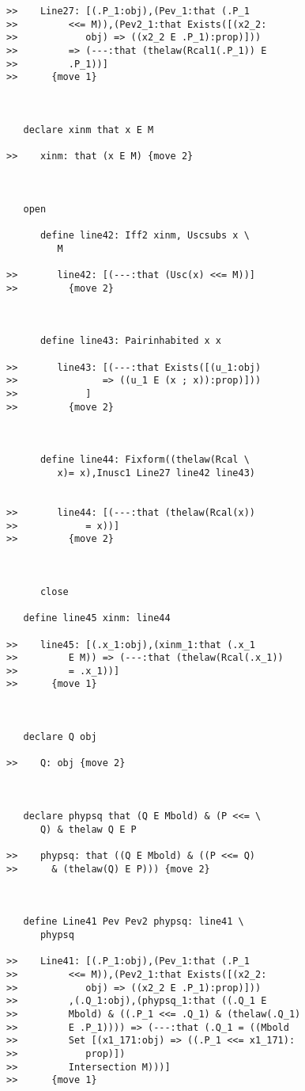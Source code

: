 \documentclass[12pt]{article}
\begin{document}
\begin{verbatim}
>>    Line27: [(.P_1:obj),(Pev_1:that (.P_1
>>         <<= M)),(Pev2_1:that Exists([(x2_2:
>>            obj) => ((x2_2 E .P_1):prop)]))
>>         => (---:that (thelaw(Rcal1(.P_1)) E
>>         .P_1))]
>>      {move 1}



   declare xinm that x E M

>>    xinm: that (x E M) {move 2}



   open

      define line42: Iff2 xinm, Uscsubs x \
         M

>>       line42: [(---:that (Usc(x) <<= M))]
>>         {move 2}



      define line43: Pairinhabited x x

>>       line43: [(---:that Exists([(u_1:obj)
>>               => ((u_1 E (x ; x)):prop)]))
>>            ]
>>         {move 2}



      define line44: Fixform((thelaw(Rcal \
         x)= x),Inusc1 Line27 line42 line43)


>>       line44: [(---:that (thelaw(Rcal(x))
>>            = x))]
>>         {move 2}



      close

   define line45 xinm: line44

>>    line45: [(.x_1:obj),(xinm_1:that (.x_1
>>         E M)) => (---:that (thelaw(Rcal(.x_1))
>>         = .x_1))]
>>      {move 1}



   declare Q obj

>>    Q: obj {move 2}



   declare phypsq that (Q E Mbold) & (P <<= \
      Q) & thelaw Q E P

>>    phypsq: that ((Q E Mbold) & ((P <<= Q)
>>      & (thelaw(Q) E P))) {move 2}



   define Line41 Pev Pev2 phypsq: line41 \
      phypsq

>>    Line41: [(.P_1:obj),(Pev_1:that (.P_1
>>         <<= M)),(Pev2_1:that Exists([(x2_2:
>>            obj) => ((x2_2 E .P_1):prop)]))
>>         ,(.Q_1:obj),(phypsq_1:that ((.Q_1 E
>>         Mbold) & ((.P_1 <<= .Q_1) & (thelaw(.Q_1)
>>         E .P_1)))) => (---:that (.Q_1 = ((Mbold
>>         Set [(x1_171:obj) => ((.P_1 <<= x1_171):
>>            prop)])
>>         Intersection M)))]
>>      {move 1}




\end{verbatim}
\end{document}

